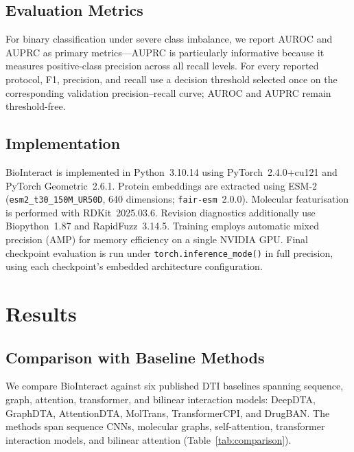 \documentclass[fleqn,10pt]{wlscirep}
\begin{document}
\subsection{Evaluation Metrics}

For binary classification under severe class imbalance, we report AUROC and
AUPRC as primary metrics---AUPRC is particularly informative because it measures
positive-class precision across all recall levels. \begingroup\color{red}For every reported protocol,
F1, precision, and recall use a decision threshold selected once on the
corresponding validation precision--recall curve; AUROC and AUPRC remain
threshold-free.\endgroup

\subsection{Implementation}

\begingroup\color{red}BioInteract is implemented in Python~3.10.14 using
PyTorch~2.4.0+cu121 and PyTorch Geometric~2.6.1.\cite{fey2019fast} Protein
embeddings are extracted using
ESM-2\cite{lin2023evolutionary} (\texttt{esm2\_t30\_150M\_UR50D}, 640
dimensions; \texttt{fair-esm}~2.0.0). Molecular featurisation is performed with
RDKit~2025.03.6.\cite{rdkit} Revision diagnostics additionally use
Biopython~1.87 and RapidFuzz~3.14.5. Training employs automatic mixed precision
(AMP) for memory efficiency on a single NVIDIA GPU. Final checkpoint evaluation
is run under \texttt{torch.inference\_mode()} in full precision, using each
checkpoint's embedded architecture configuration.\endgroup

\section{Results}
\label{sec:results}

\subsection{Comparison with Baseline Methods}

\begingroup\color{red}
We compare BioInteract against six published DTI baselines spanning sequence,
graph, attention, transformer, and bilinear interaction models:
DeepDTA,\cite{ozturk2018deepdta} GraphDTA,\cite{nguyen2021graphdta}
AttentionDTA,\cite{zhao2022attentiondta} MolTrans,\cite{huang2021moltrans}
TransformerCPI,\cite{chen2020transformercpi} and DrugBAN.\cite{bai2023drugban}
The methods span sequence CNNs, molecular graphs, self-attention, transformer
interaction models, and bilinear attention (Table~\ref{tab:comparison}).
\end{document}
